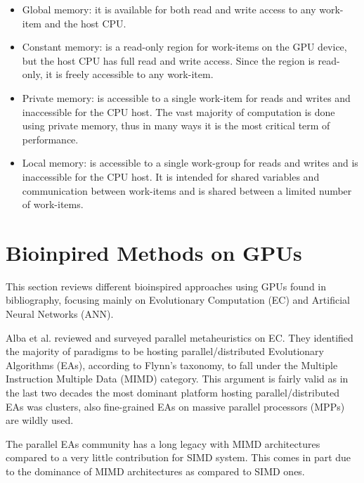 \documentclass[prodmode,acmtecs]{acmsmall}
\begin{document}
\begin{itemize}
\item Global memory: it is available for both read and write access to any work-item and the host CPU.
\item Constant memory: is a read-only region for work-items on the GPU device, but the host CPU has full read and write access. Since the region is read-only, it is freely accessible to any work-item.
\item Private memory: is accessible to a single work-item for reads and writes and inaccessible for the CPU host. The vast majority of computation is done using private memory, thus in many ways it is the most critical term of performance.
\item Local memory: is accessible to a single work-group for reads and writes and is inaccessible for the CPU host. It is intended for shared variables and communication between work-items and is shared between a limited number of work-items.
\end{itemize} 


\section{Bioinpired Methods on GPUs}
\label{sec:bioinfor_apps}

This section reviews different bioinspired approaches using GPUs found in bibliography, focusing mainly on Evolutionary Computation (EC) and Artificial Neural Networks (ANN).

Alba et al. \cite{Alba2005book} reviewed and surveyed parallel metaheuristics on EC. They identified the majority of paradigms to be hosting parallel/distributed Evolutionary Algorithms (EAs), according to Flynn's taxonomy, to fall under the Multiple Instruction Multiple Data (MIMD) category. This argument is fairly valid as in the last two decades the most dominant platform hosting parallel/distributed EAs was clusters, also fine-grained EAs on massive parallel processors (MPPs) are wildly used.

The parallel EAs community has a long legacy with MIMD architectures compared to a very little contribution for SIMD system. This comes in part due to the dominance of MIMD architectures as compared to SIMD ones.
\end{document}
